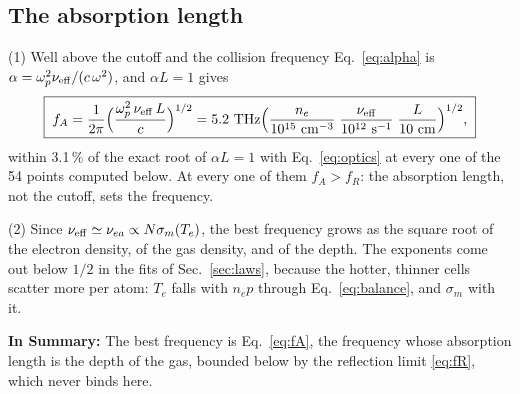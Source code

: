 \documentclass[11pt]{article}
\numberwithin{equation}{section}
\newcommand{\nueff}{\nu_{\rm eff}}
\newcommand{\nuea}{\nu_{ea}}
\newcommand{\Te}{T_e}
\begin{document}
\subsection{The absorption length}
\label{sec:length}
{\noindent}(1) Well above the cutoff and the collision frequency Eq.~\eqref{eq:alpha} is
$\alpha=\omega_p^2\nueff/(c\,\omega^2)$, and $\alpha L=1$ gives
\begin{equation}
\boxed{\;f_A=\frac{1}{2\pi}\Big(\frac{\omega_p^2\,\nueff\,L}{c}\Big)^{1/2}
=5.2~{\rm THz}\Big(\frac{n_e}{10^{15}~{\rm cm^{-3}}}\;\frac{\nueff}{10^{12}~{\rm s^{-1}}}\;
\frac{L}{10~{\rm cm}}\Big)^{1/2},\;}
\label{eq:fA}
\end{equation}
within 3.1\,\% of the exact root of $\alpha L=1$ with Eq.~\eqref{eq:optics} at every one of
the 54 points computed below. At every one of them $f_A>f_R$: the absorption length, not
the cutoff, sets the frequency.

{\noindent}(2) Since $\nueff\simeq\nuea\propto N\sigma_m(\Te)$, the best frequency grows
as the square root of the electron density, of the gas density, and of the depth. The
exponents come out below $1/2$ in the fits of Sec.~\ref{sec:laws}, because the hotter,
thinner cells scatter more per atom: $\Te$ falls with $n_ep$ through
Eq.~\eqref{eq:balance}, and $\sigma_m$ with it.

\medskip
\noindent\textbf{In Summary:} The best frequency is Eq.~\eqref{eq:fA}, the frequency
whose absorption length is the depth of the gas, bounded below by the reflection limit
\eqref{eq:fR}, which never binds here.


\end{document}
